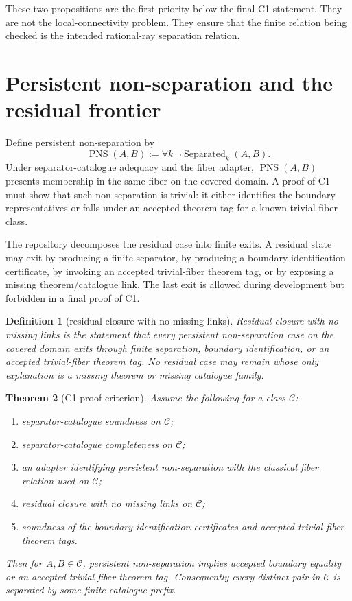 \documentclass[11pt]{amsart}
\newtheorem{theorem}{Theorem}[section]
\newtheorem{definition}[theorem]{Definition}
\begin{document}
These two propositions are the first priority below the final C1 statement.  They are not the local-connectivity problem.  They ensure that the finite relation being checked is the intended rational-ray separation relation.

\section{Persistent non-separation and the residual frontier}

Define persistent non-separation by
\[
        \operatorname{PNS}(A,B):=\forall k\,\neg\operatorname{Separated}_k(A,B).
\]
Under separator-catalogue adequacy and the fiber adapter, \(\operatorname{PNS}(A,B)\) presents membership in the same fiber on the covered domain.  A proof of C1 must show that such non-separation is trivial: it either identifies the boundary representatives or falls under an accepted theorem tag for a known trivial-fiber class.

The repository decomposes the residual case into finite exits.  A residual state may exit by producing a finite separator, by producing a boundary-identification certificate, by invoking an accepted trivial-fiber theorem tag, or by exposing a missing theorem/catalogue link.  The last exit is allowed during development but forbidden in a final proof of C1.

\begin{definition}[residual closure with no missing links]
Residual closure with no missing links is the statement that every persistent non-separation case on the covered domain exits through finite separation, boundary identification, or an accepted trivial-fiber theorem tag.  No residual case may remain whose only explanation is a missing theorem or missing catalogue family.
\end{definition}

\begin{theorem}[C1 proof criterion]
Assume the following for a class \(\mathcal C\):
\begin{enumerate}[label=(\alph*)]
\item separator-catalogue soundness on \(\mathcal C\);
\item separator-catalogue completeness on \(\mathcal C\);
\item an adapter identifying persistent non-separation with the classical fiber relation used on \(\mathcal C\);
\item residual closure with no missing links on \(\mathcal C\);
\item soundness of the boundary-identification certificates and accepted trivial-fiber theorem tags.
\end{enumerate}
Then for \(A,B\in\mathcal C\), persistent non-separation implies accepted boundary equality or an accepted trivial-fiber theorem tag.  Consequently every distinct pair in \(\mathcal C\) is separated by some finite catalogue prefix.
\end{theorem}
\end{document}
